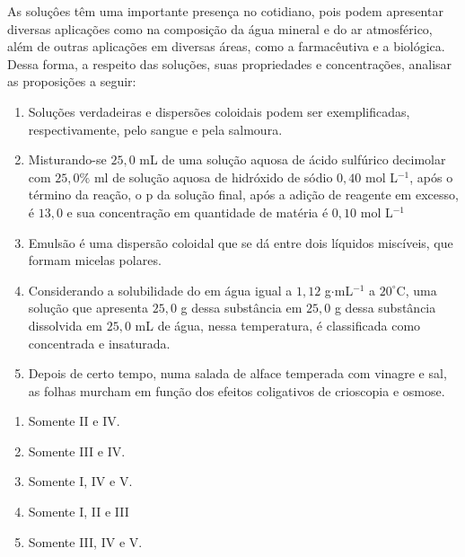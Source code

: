 As soluçôes têm uma importante presença no cotidiano, pois podem apresentar diversas aplicações como na composição da água mineral e do ar atmosférico, além de outras aplicações em diversas áreas, como a farmacêutiva e a biológica. Dessa forma, a respeito das soluções, suas propriedades e concentrações, analisar as proposições a seguir:

\begin{enumerate}[label = (\Roman*)]
	
	\item Soluções verdadeiras e dispersões coloidais podem ser exemplificadas, respectivamente, pelo sangue e pela salmoura.
	\item Misturando-se $25,0$ mL de uma solução aquosa de ácido sulfúrico decimolar com $25,0\%$ ml de solução aquosa de hidróxido de sódio $0,40$ mol L$^{-1}$, após o término da reação, o p da solução final, após a adição de reagente em excesso, é $13,0$ e sua concentração em quantidade de matéria é $0,10$ mol L$^{-1}$
	\item Emulsão é uma dispersão coloidal que se dá entre dois líquidos miscíveis, que formam micelas polares.
	\item Considerando a solubilidade do  em água igual a $1,12$ g$\cdot$mL$^{-1}$ a $20 ^\circ$C, uma solução que apresenta $25,0$ g dessa substância em $25,0$ g dessa substância dissolvida em $25,0$ mL de água, nessa temperatura, é classificada como concentrada e insaturada.
	\item Depois de certo tempo, numa salada de alface temperada com vinagre e sal, as folhas murcham em função dos efeitos coligativos de crioscopia e osmose. 
\end{enumerate}

\begin{enumerate}[label = (\alph*)]
	
	\item Somente II e IV. 
	\item Somente III e IV. 
	\item Somente I, IV e V. 
	\item Somente I, II e III
	\item Somente III, IV e V.
\end{enumerate}
